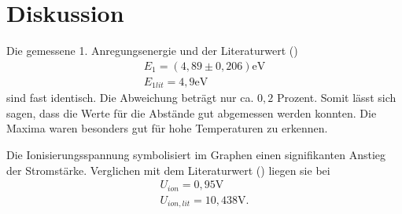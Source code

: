 \section{Diskussion}
\label{sec:Diskussion}

Die gemessene 1. Anregungsenergie und der Literaturwert (\cite{kent3})
\begin{align*}
E_1 = (4,89 \pm 0,206) \si{\eV} \\
E_{1lit} = 4,9 \si{\eV}
\end{align*}
sind fast identisch. Die Abweichung beträgt nur ca. $0,2$ Prozent.
Somit lässt sich sagen, dass die Werte für die Abstände gut abgemessen werden konnten. 
Die Maxima waren besonders gut für hohe Temperaturen zu erkennen.

Die Ionisierungsspannung symbolisiert im Graphen einen signifikanten Anstieg der Stromstärke.
Verglichen mit dem Literaturwert (\cite{kent2}) liegen sie bei
\begin{align*}
U_{ion} = 0,95\si{\V} \\
U_{ion,lit} = 10,438\si{\V}.
\end{align*}
